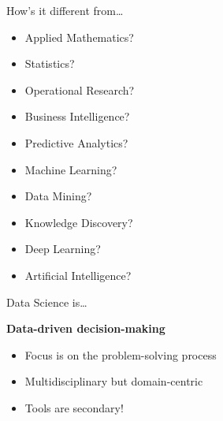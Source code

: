 \begin{frame}{How's it different from\ldots}
    \begin{itemize}
        \item Applied Mathematics?
        \item Statistics?
        \item Operational Research?
        \item Business Intelligence?
        \item Predictive Analytics?
        \item Machine Learning?
        \item Data Mining?
        \item Knowledge Discovery?
        \item Deep Learning?
        \item Artificial Intelligence?
    \end{itemize}
\end{frame}

\begin{frame}{Data Science is\ldots}
    \begin{center}
        \Large\bf%
        Data\hyp{}driven decision\hyp{}making
    \end{center}
    \vfill
    \begin{itemize}
        \item Focus is on the problem\hyp{}solving process
        \item Multidisciplinary but domain\hyp{}centric
        \item Tools are secondary!
    \end{itemize}
\end{frame}

